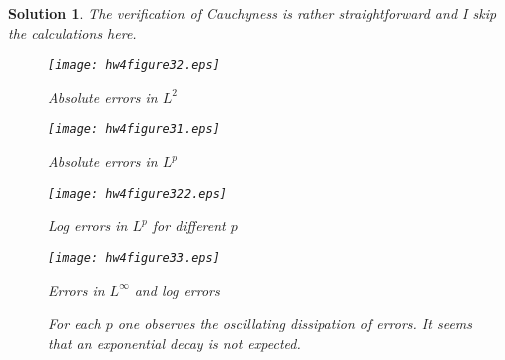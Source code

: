 \documentclass[6pt]{article}
\newtheorem{solution}{Solution}
\numberwithin{equation}{section}
\begin{document}
\begin{enumerate}
\begin{solution}
The verification of Cauchyness is rather straightforward and I skip the calculations here.
\begin{figure}[h!]\vspace{-3mm}
\begin{minipage}{0.5\columnwidth}
\texttt{[image: hw4figure32.eps]}
\caption*{Absolute errors in $L^2$}
\end{minipage}
\begin{minipage}{0.5\columnwidth}
\texttt{[image: hw4figure31.eps]}
\caption*{Absolute errors in $L^p$}
\end{minipage}
\vspace{-1mm}\caption{ }\label{ }
\end{figure}

\begin{figure}[h!]\vspace{-3mm}
\begin{minipage}{0.5\columnwidth}
\texttt{[image: hw4figure322.eps]}
\caption*{Log errors in $L^p$ for different $p$}
\end{minipage}
\begin{minipage}{0.5\columnwidth}
\texttt{[image: hw4figure33.eps]}
\caption*{Errors in $L^\infty$ and log errors}
\end{minipage}
\vspace{-1mm}\caption{For each $p$ one observes the oscillating dissipation of errors.  It seems that an exponential decay is not expected.}
\end{figure}
\end{solution}


\end{enumerate}
\end{document}
